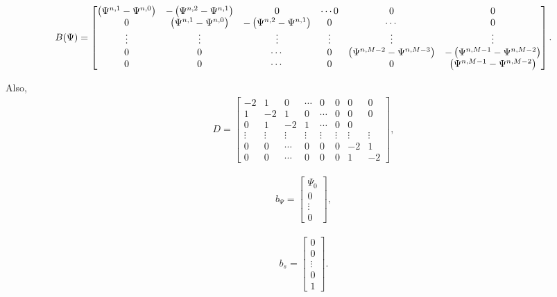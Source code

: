 \begin{align}
B(\Psi) = \begin{bmatrix}
    \left({\Psi^{n,1} - \Psi^{n, 0}}\right)   &  -\left({\Psi^{n,2} - \Psi^{n, 1}}\right)   & 0  &   \cdots   0   &   0   &   0 \\
    0                                &  \left({\Psi^{n,1} - \Psi^{n, 0}}\right)    & -\left({\Psi^{n,2} - \Psi^{n, 1}}\right)   & 0  & \cdots    &   0 \\
    \vdots    &  \vdots              &\vdots           &\vdots & \vdots & \vdots \\ 
    0         &  0                   &  \cdots        &  0              & \left({\Psi^{n,M-2} - \Psi^{n, M-3}}\right)   & -\left({\Psi^{n,M-1} - \Psi^{n, M-2}}\right) \\
0         &  0                   &  \cdots              &     0      &  0    &  \left({\Psi^{n,M-1} - \Psi^{n, M-2}}\right)
\end{bmatrix}.
\end{align}

Also, 
\begin{align}
D = \begin{bmatrix}
    -2   &  1   & 0  &   \cdots & 0   &   0   &   0   &   0 \\
    1    &  -2    & 1   & 0  & \cdots   & 0   &   0   &   0 \\
    0         & 1                    &  -2   & 1 & \cdots    &   0   &   0 \\
    \vdots    &  \vdots              &\vdots          &  \vdots  & \vdots   &\vdots & \vdots & \vdots \\ 
    0         &  0                   &  \cdots        &  0       &  0         &  0         & -2   & 1 \\
0         &  0                   &  \cdots        &  0           &  0         &     0      &  1    &  -2
\end{bmatrix},
\end{align}

\begin{align}
    b_\Psi = \begin{bmatrix}
        \Psi_0\\
        0\\
        \vdots\\
        0
    \end{bmatrix},
\end{align}

\begin{align}
    b_s = \begin{bmatrix}
        0\\
        0\\
        \vdots\\
        0\\
        1\end{bmatrix}.
\end{align}

